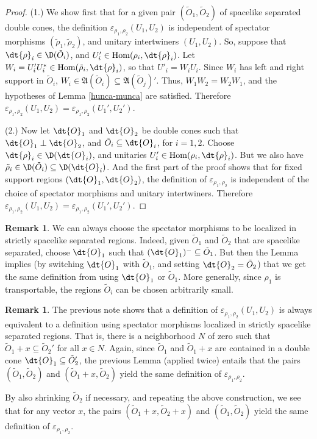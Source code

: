 \documentclass[11pt]{article}
\newcommand{\alg}[1]{\mathfrak{#1}}
\theoremstyle{definition}
\theoremstyle{definition}
\newtheorem{note}[thm]{Remark}
\theoremstyle{remark}
\newcommand{\ve}{\varepsilon}
\def\wt#1{{\tilde #1}}
\newcommand{\Hom}{\mathrm{Hom}}
\begin{document}
\begin{proof} (1.) We show first that for a given pair $(\wt O_1,\wt O_2)$ of
  spacelike separated double cones, the definition $\ve _{\rho _1,\rho _2}(U_1,U_2)$
  is independent of spectator morphisms $(\wt \rho _1,\wt \rho _2)$, and unitary
  intertwiners $(U_1,U_2)$.  So, suppose that $\dt{\rho}_i\in \D (\wt O_i)$, and
  $U'_i\in \Hom (\rho _i,\dt{\rho} _i )$.  Let $W_i=U_i'U_i^*\in \Hom (\wt \rho
  _i,\dt{\rho} _i)$, so that $U'_i=W_iU_i$.  Since $W_i$ has left and right support
  in $\wt O_i$, $W _i\in \alg{A}(\wt O_i)\subseteq \alg{A}(\wt O_j)'$.  Thus,
  $W_1W_2=W_2W_1$, and the hypotheses of Lemma \ref{hunca-munca} are satisfied.
  Therefore $\ve _{\rho _1,\rho _2}(U_1,U_2)=\ve _{\rho _1,\rho _2}(U_1',U_2')$.

  \bigskip (2.) Now let $\dt{O}_1$ and $\dt{O}_2$ be double cones such that
  $\dt{O}_1\perp \dt{O}_2$, and $\wt O_i\subseteq \dt{O}_i$, for $i=1,2$.  Choose
  $\dt{\rho}_i\in \D (\dt{O}_i)$, and unitaries $U_i'\in \Hom (\rho _i,\dt{\rho}_i)$.
  But we also have $\wt \rho _i\in \D (\wt O_i)\subseteq \D (\dt{O}_i)$.  And the
  first part of the proof shows that for fixed support regions $(\dt{O}_1,\dt{O}_2)$,
  the definition of $\ve _{\rho _1,\rho _2}$ is independent of the choice of
  spectator morphisms and unitary intertwiners.  Therefore $\ve _{\rho _1,\rho
    _2}(U_1,U_2)=\ve _{\rho _1,\rho _2}(U_1',U_2')$.
\end{proof}

\begin{note} We can always choose the spectator morphisms to be localized in strictly
  spacelike separated regions.  Indeed, given $\wt O_1$ and $\wt O_2$ that are
  spacelike separated, choose $\dt{O}_1$ such that $(\dt{O}_1)^{-}\subseteq \wt O_1$.
  But then the Lemma implies (by switching $\dt{O}_1$ with $\wt O_1$, and setting
  $\dt{O}_2=\wt O_2$) that we get the same definition from using $\dt{O}_1$ or $\wt
  O_1$.  More generally, since $\rho _1$ is transportable, the regions $\wt O_i$ can
  be chosen arbitrarily small.
\end{note}

\begin{note} The previous note shows that a definition of $\ve _{\rho _1,\rho
    _2}(U_1,U_2)$ is always equivalent to a definition using spectator morphisms
  localized in strictly spacelike separated regions.  That is, there is a
  neighborhood $N$ of zero such that $\wt O_1+x\subseteq \wt O_2'$ for all $x\in N$.
  Again, since $\wt O_1$ and $\wt O_1+x$ are contained in a double cone
  $\dt{O}_1\subseteq \wt O_2'$, the previous Lemma (applied twice) entails that the
  pairs $(\wt O_1,\wt O_2)$ and $(\wt O_1+x,\wt O_2)$ yield the same definition of
  $\ve _{\rho _1,\rho _2}$.

  By also shrinking $\wt O_2$ if necessary, and repeating the above construction, we
  see that for any vector $x$, the pairs $(\wt O_1+x,\wt O_2+x)$ and $(\wt O_1,\wt
  O_2)$ yield the same definition of $\ve _{\rho _1,\rho _2}$. \label{translate}
\end{note}
\end{document}
